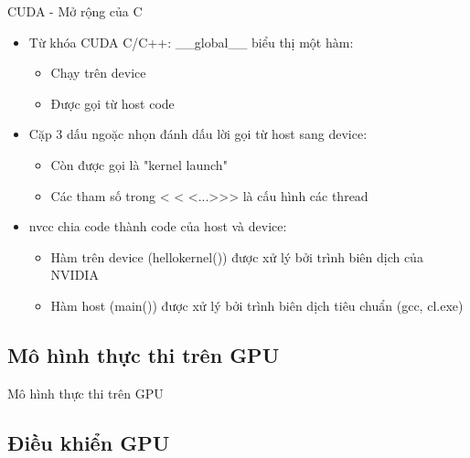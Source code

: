 \documentclass[10pt]{beamer}
\theoremstyle{remark}
\numberwithin{algocf}{section}
\numberwithin{equation}{section}
\numberwithin{dl}{section}
\numberwithin{figure}{section}
\begin{document}
\begin{frame}{CUDA - Mở rộng của C}
    \begin{itemize}
        \item Từ khóa CUDA C/C++: \_\_global\_\_ biểu thị một hàm:
        \begin{itemize}
            \item Chạy trên device 
            \item Được gọi từ host code
        \end{itemize}
        \item Cặp 3 dấu ngoặc nhọn đánh dấu lời gọi từ host sang device:
        \begin{itemize}
            \item Còn được gọi là "kernel launch"
            \item Các tham số trong < < <...>>> là cấu hình các thread
        \end{itemize}
        \item nvcc chia code thành code của host và device:
        \begin{itemize}
            \item Hàm trên device (hellokernel()) được xử lý bởi trình biên dịch của NVIDIA
            \item Hàm host (main()) được xử lý bởi trình biên dịch tiêu chuẩn (gcc, cl.exe)
        \end{itemize}
    \end{itemize}
\end{frame}

\subsection{Mô hình thực thi trên GPU}

\begin{frame}{Mô hình thực thi trên GPU}
    
\end{frame}

\subsection{Điều khiển GPU}
\end{document}
